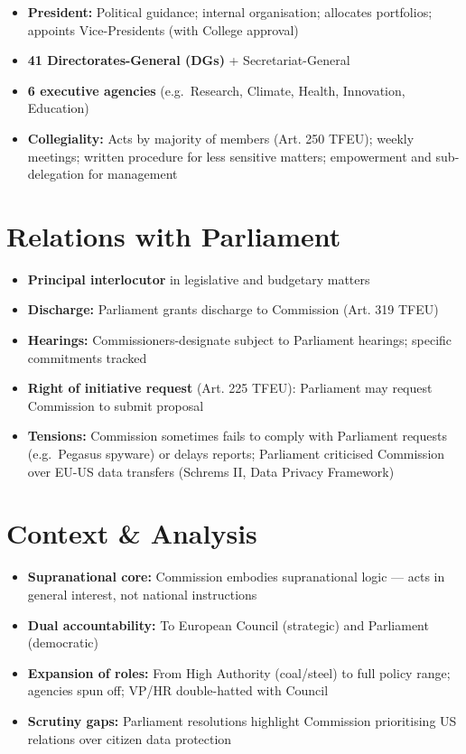 \documentclass[11pt,a4paper]{article}
\begin{document}
\begin{itemize}
\item \textbf{President:} Political guidance; internal organisation; allocates portfolios; appoints Vice-Presidents (with College approval)
\item \textbf{41 Directorates-General (DGs)} + Secretariat-General
\item \textbf{6 executive agencies} (e.g.\ Research, Climate, Health, Innovation, Education)
\item \textbf{Collegiality:} Acts by majority of members (Art. 250 TFEU); weekly meetings; written procedure for less sensitive matters; empowerment and sub-delegation for management
\end{itemize}

\section*{Relations with Parliament}

\begin{itemize}
\item \textbf{Principal interlocutor} in legislative and budgetary matters
\item \textbf{Discharge:} Parliament grants discharge to Commission (Art. 319 TFEU)
\item \textbf{Hearings:} Commissioners-designate subject to Parliament hearings; specific commitments tracked
\item \textbf{Right of initiative request} (Art. 225 TFEU): Parliament may request Commission to submit proposal
\item \textbf{Tensions:} Commission sometimes fails to comply with Parliament requests (e.g.\ Pegasus spyware) or delays reports; Parliament criticised Commission over EU-US data transfers (Schrems II, Data Privacy Framework)
\end{itemize}

\section*{Context \& Analysis}

\begin{itemize}
\item \textbf{Supranational core:} Commission embodies supranational logic --- acts in general interest, not national instructions
\item \textbf{Dual accountability:} To European Council (strategic) and Parliament (democratic)
\item \textbf{Expansion of roles:} From High Authority (coal/steel) to full policy range; agencies spun off; VP/HR double-hatted with Council
\item \textbf{Scrutiny gaps:} Parliament resolutions highlight Commission prioritising US relations over citizen data protection
\end{itemize}
\end{document}
